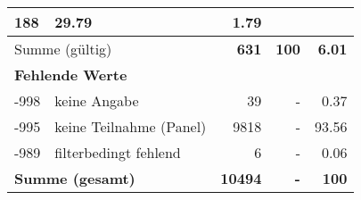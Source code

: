 \begin{longtable}{lXrrr}
       \num{188} &
       \num[round-mode=places,round-precision=2]{29,79} &
         \num[round-mode=places,round-precision=2]{1,79} \\
     \midrule
     \multicolumn{2}{l}{Summe (gültig)} &
       \textbf{\num{631}} &
     \textbf{100} &
       \textbf{\num[round-mode=places,round-precision=2]{6,01}} \\
     \multicolumn{5}{l}{\textbf{Fehlende Werte}}\\
       -998 &
       keine Angabe &
         \num{39} &
        - &
         \num[round-mode=places,round-precision=2]{0,37} \\
       -995 &
       keine Teilnahme (Panel) &
         \num{9818} &
        - &
         \num[round-mode=places,round-precision=2]{93,56} \\
       -989 &
       filterbedingt fehlend &
         \num{6} &
        - &
         \num[round-mode=places,round-precision=2]{0,06} \\
     \midrule
     \multicolumn{2}{l}{\textbf{Summe (gesamt)}} &
          \textbf{\num{10494}} &
        \textbf{-} &
        \textbf{100} \\
     \bottomrule
     \end{longtable}
     
